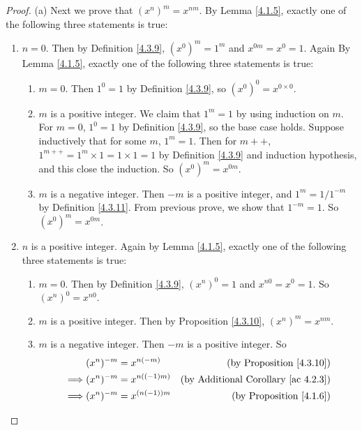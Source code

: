 \begin{proof}{(a)}
Next we prove that \((x^n)^m = x^{nm}\).
By Lemma \ref{4.1.5}, exactly one of the following three statements is true:
\begin{enumerate}[label=(\Roman*)]
    \item \(n = 0\).
    Then by Definition \ref{4.3.9}, \((x^0)^m = 1^m\) and \(x^{0m} = x^0 = 1\).
    Again By Lemma \ref{4.1.5}, exactly one of the following three statements is true:
    \begin{enumerate}[label=(\roman*)]
        \item \(m = 0\).
        Then \(1^0 = 1\) by Definition \ref{4.3.9}, so \((x^0)^0 = x^{0 \times 0}\).
        \item \(m\) is a positive integer.
        We claim that \(1^m = 1\) by using induction on \(m\).
        For \(m = 0\), \(1^0 = 1\) by Definition \ref{4.3.9}, so the base case holds.
        Suppose inductively that for some \(m\), \(1^m = 1\).
        Then for \(m++\), \(1^{m++} = 1^m \times 1 = 1 \times 1 = 1\) by Definition \ref{4.3.9} and induction hypothesis, and this close the induction.
        So \((x^0)^m = x^{0m}\).
        \item \(m\) is a negative integer.
        Then \(-m\) is a positive integer, and \(1^m = 1 / 1^{-m}\) by Definition \ref{4.3.11}.
        From previous prove, we show that \(1^{-m} = 1\).
        So \((x^0)^m = x^{0m}\).
    \end{enumerate}
    \item \(n\) is a positive integer.
    Again by Lemma \ref{4.1.5}, exactly one of the following three statements is true:
    \begin{enumerate}[label=(\roman*)]
        \item \(m = 0\).
        Then by Definition \ref{4.3.9}, \((x^n)^0 = 1\) and \(x^{n0} = x^0 = 1\).
        So \((x^n)^0 = x^{n0}\).
        \item \(m\) is a positive integer.
        Then by Proposition \ref{4.3.10}, \((x^n)^m = x^{nm}\).
        \item \(m\) is a negative integer.
        Then \(-m\) is a positive integer.
        So
        \begin{align*}
        & (x^n)^{-m} = x^{n(-m)} & \text{(by Proposition \ref{4.3.10})} \\
        \implies & (x^n)^{-m} = x^{n((-1)m)} & \text{(by Additional Corollary \ref{ac 4.2.3})} \\
        \implies & (x^n)^{-m} = x^{(n(-1))m} & \text{(by Proposition \ref{4.1.6})} \\

\end{align*}
\end{enumerate}
\end{enumerate}
\end{proof}

